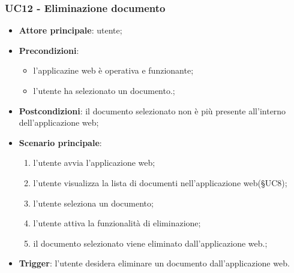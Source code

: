 \documentclass[10pt, a4paper]{article}
\begin{document}
    \subsubsection{UC12 - Eliminazione documento}
    \begin{itemize}
        \item \textbf{Attore principale}: utente;
        \item \textbf{Precondizioni}: 
        \begin{itemize}
            \item l'applicazine web è operativa e funzionante;
            \item l'utente ha selezionato un documento.;
        \end{itemize}
        \item \textbf{Postcondizioni}: il documento selezionato non è più presente all'interno dell'applicazione web;
        \item \textbf{Scenario principale}:
            \begin{enumerate}
                \item l'utente avvia l'applicazione web;
                \item l'utente visualizza la lista di documenti nell'applicazione web(\S UC8);
                \item l'utente seleziona un documento;
                \item l'utente attiva la funzionalità di eliminazione;
                \item il documento selezionato viene eliminato dall'applicazione web.;
            \end{enumerate}
        \item \textbf{Trigger}: l'utente desidera eliminare un documento dall'applicazione web.
    \end{itemize}
\end{document}
